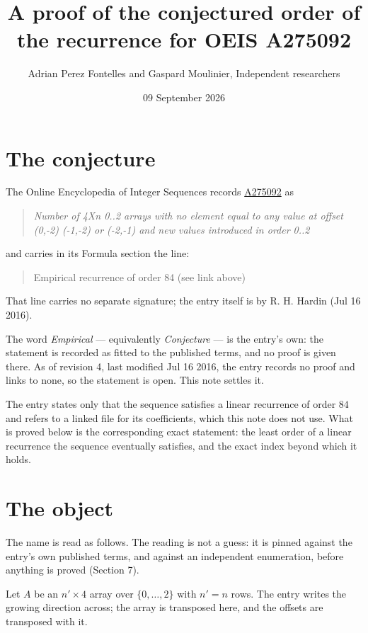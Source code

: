 \documentclass[11pt]{article}
\title{A proof of the conjectured order of the recurrence for OEIS A275092}
\author{Adrian Perez Fontelles and Gaspard Moulinier, Independent researchers}
\date{09 September 2026}
\theoremstyle{definition}
\begin{document}
\maketitle
\section{The conjecture}

The Online Encyclopedia of Integer Sequences records \href{https://oeis.org/A275092}{A275092} as

\begin{quote}\itshape Number of 4Xn 0..2 arrays with no element equal to any value at offset (0,-2) (-1,-2) or (-2,-1) and new values introduced in order 0..2\end{quote}

and carries in its Formula section the line:

\begin{quote}\ttfamily Empirical recurrence of order 84 (see link above)\end{quote}

That line carries no separate signature; the entry itself is by R. H. Hardin (Jul 16 2016).

The word {\itshape Empirical} --- equivalently {\itshape Conjecture} --- is the entry's own: the statement is recorded as fitted to the published terms, and no proof is given there. As of revision 4, last modified Jul 16 2016, the entry records no proof and links to none, so the statement is open. This note settles it.

The entry states only that the sequence satisfies a linear recurrence of order $84$ and refers to a linked file for its coefficients, which this note does not use. What is proved below is the corresponding exact statement: the least order of a linear recurrence the sequence eventually satisfies, and the exact index beyond which it holds.

\section{The object}

The name is read as follows. The reading is not a guess: it is pinned against the entry's own published terms, and against an independent enumeration, before anything is proved (Section 7).

Let $A$ be an $n' \times 4$ array over $\{0,\dots,2\}$ with $n' = n$ rows. The entry writes the growing direction across; the array is transposed here, and the offsets are transposed with it.
\end{document}

